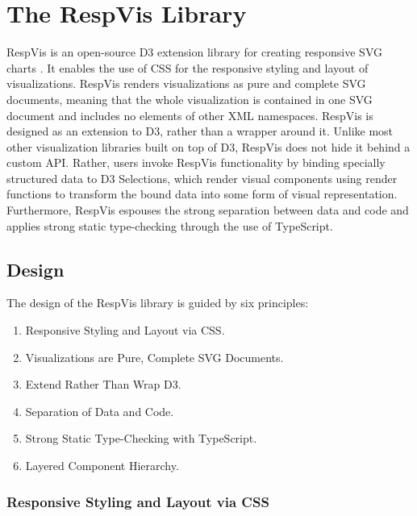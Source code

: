 
\chapter{The RespVis Library}
\label{chap:RespVis}

RespVis is an open-source D3 extension library for creating responsive
SVG charts \parencite{RespVisGitHub}. It enables the use of CSS for
the responsive styling and layout of visualizations. RespVis renders
visualizations as pure and complete SVG documents, meaning that the
whole visualization is contained in one SVG document and includes no
elements of other XML namespaces. RespVis is designed as an extension
to D3, rather than a wrapper around it. Unlike most other
visualization libraries built on top of D3, RespVis does not hide it
behind a custom API. Rather, users invoke RespVis functionality by
binding specially structured data to D3 Selections, which render
visual components using render functions to transform the bound data
into some form of visual representation. Furthermore, RespVis espouses
the strong separation between data and code and applies strong static
type-checking through the use of TypeScript.





\section{Design}
\label{sec:Design}

The design of the RespVis library is guided by six principles:
\begin{enumerate}
\item Responsive Styling and Layout via CSS.
\item Visualizations are Pure, Complete SVG Documents.
\item Extend Rather Than Wrap D3.
\item Separation of Data and Code.
\item Strong Static Type-Checking with TypeScript.
\item Layered Component Hierarchy.
\end{enumerate}



\subsection{Responsive Styling and Layout via CSS}


